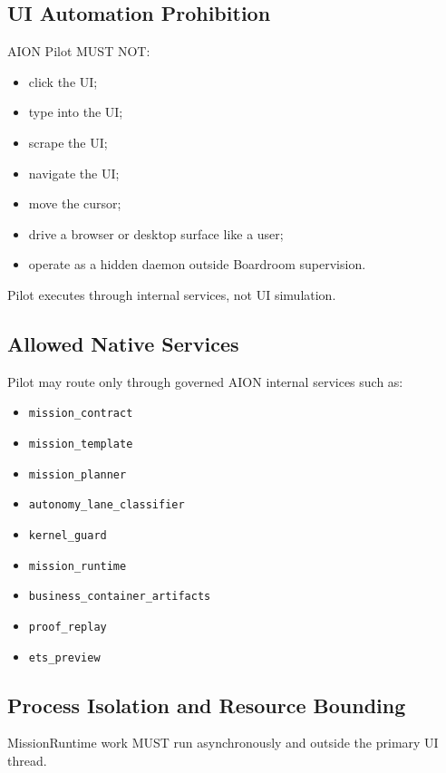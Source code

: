 \subsection{UI Automation Prohibition}

AION Pilot MUST NOT:

\begin{itemize}
  \item click the UI;
  \item type into the UI;
  \item scrape the UI;
  \item navigate the UI;
  \item move the cursor;
  \item drive a browser or desktop surface like a user;
  \item operate as a hidden daemon outside Boardroom supervision.
\end{itemize}

Pilot executes through internal services, not UI simulation.

\subsection{Allowed Native Services}

Pilot may route only through governed AION internal services such as:

\begin{itemize}
  \item \texttt{mission\_contract}
  \item \texttt{mission\_template}
  \item \texttt{mission\_planner}
  \item \texttt{autonomy\_lane\_classifier}
  \item \texttt{kernel\_guard}
  \item \texttt{mission\_runtime}
  \item \texttt{business\_container\_artifacts}
  \item \texttt{proof\_replay}
  \item \texttt{ets\_preview}
\end{itemize}

\subsection{Process Isolation and Resource Bounding}

MissionRuntime work MUST run asynchronously and outside the primary UI thread.

